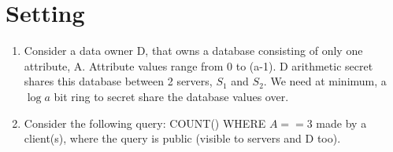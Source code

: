 
\clearpage
{}

%
\setcounter{section}{0} %

\section{Setting}
\begin{enumerate}
    \item Consider a data owner D, that owns a database consisting of only one attribute, A. Attribute values range from 0 to (a-1). D arithmetic secret shares this database between 2 servers, $S_1$ and $S_2$. We need at minimum, a $\log a$ bit ring to secret share the database values over.
    \item Consider the following query: COUNT() WHERE $A == 3$ made by a client(s), where the query is public (visible to servers and D too).
\end{enumerate}

